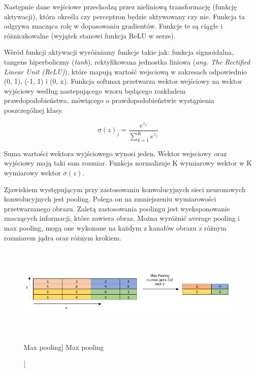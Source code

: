 \documentclass[a4paper,12pt]{article}
\begin{document}
        Następnie dane wejściowe przechodzą przez nieliniową transformację (funkcję aktywacji), która określa czy perceptron będzie aktywowany czy nie. Funkcja ta odgrywa znacząca rolę w dopasowaniu gradientów. Funkcje te są ciągłe i różniczkowalne (wyjątek stanowi funkcja ReLU w zerze).
        
        Wśród funkcji aktywacji wyróżniamy funkcje takie jak: funkcja sigmoidalna,  tangens hiperboliczny (\textit{tanh}), rektyfikowana jednostka liniowa (\textit{ang. The Rectified Linear Unit (ReLU)}), 
        które mapują wartość wejsciową w zakresach odpowiednio (0, 1), (-1, 1) i (0, x). Funkcja softmax przetwarza wektor wejściowy na wektor wyjściowy według nastepującego wzoru będącego rozkładem prawdopodobieństwa, mówiącego o prawdopodobieństwie wystąpienia poszczególnej klasy. 
        
        \begin{displaymath}
            \sigma (z)_{j} = \frac{e^{z_{j}}}{ \sum_{k=1}^K e^{z_{j}}}
        \end{displaymath}

        Suma wartości wektora wyjściowego wynosi jeden. Wektor wejsciowy oraz wyjściowy mają taki sam rozmiar. Funkcja normalizuje K wymiarowy wektor w K wymiarowy wektor  $ \sigma (z)$. 
        
	    \par Zjawiskiem występującym przy zastosowaniu konwolucyjnych sieci neuronowych konwolucyjnych jest pooling.
	    Polega on na zmniejszeniu wymiarowości przetwarzanego obrazu. Zaletą zastosowania poolingu jest wyeksponowanie znaczących informacji, które zawiera obraz. Można wyróżnić average pooling i max pooling, mogą one wykonane na każdym z kanałów obrazu z różnym rozmiarem jądra oraz różnym krokiem. 
	 
	    \begin{figure}[!ht]
            \centering
                \includegraphics[width=17cm, height=4.5cm]{image//maxPoolingImg.png}
                \caption
                [Max pooling]
                {Max pooling}
        \end{figure}
        
\end{document}
